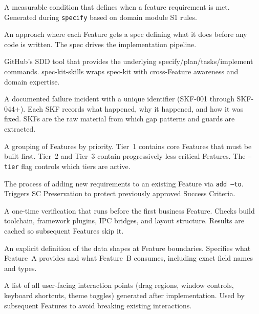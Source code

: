 \documentclass[11pt,a4paper,openright,twoside]{report}
\begin{document}
\begin{description}[style=nextline]
  \item[SC (Success Criterion)] A measurable condition that defines when a feature requirement is met. Generated during \texttt{specify} based on domain module S1 rules.

  \item[SDD (Specification-Driven Development)] An approach where each Feature gets a spec defining what it does before any code is written. The spec drives the implementation pipeline.

  \item[spec-kit] GitHub's SDD tool that provides the underlying specify/plan/tasks/implement commands. spec-kit-skills wraps spec-kit with cross-Feature awareness and domain expertise.

  \item[SKF (Skill Feedback)] A documented failure incident with a unique identifier (SKF-001 through SKF-044+). Each SKF records what happened, why it happened, and how it was fixed. SKFs are the raw material from which gap patterns and guards are extracted.

  \item[Tier] A grouping of Features by priority. Tier~1 contains core Features that must be built first. Tier~2 and Tier~3 contain progressively less critical Features. The \texttt{--tier} flag controls which tiers are active.

  \item[Augmentation] The process of adding new requirements to an existing Feature via \texttt{add --to}. Triggers SC Preservation to protect previously approved Success Criteria.

  \item[Foundation Gate] A one-time verification that runs before the first business Feature. Checks build toolchain, framework plugins, IPC bridges, and layout structure. Results are cached so subsequent Features skip it.

  \item[Integration Contract] An explicit definition of the data shapes at Feature boundaries. Specifies what Feature~A provides and what Feature~B consumes, including exact field names and types.

  \item[Interaction Surface Inventory] A list of all user-facing interaction points (drag regions, window controls, keyboard shortcuts, theme toggles) generated after implementation. Used by subsequent Features to avoid breaking existing interactions.


\end{description}
\end{document}
